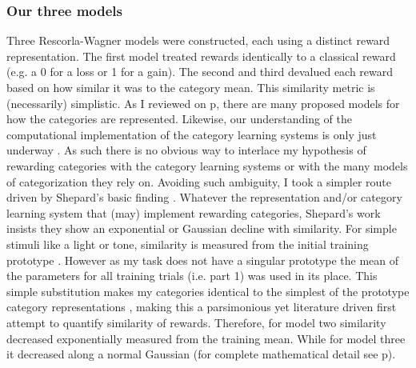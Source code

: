 \documentclass[doc,12pt]{apa}        %
\begin{document}
\subsubsection{Our three models}
\label{subsub:catquant}
Three Rescorla-Wagner models were constructed, each using a distinct reward representation.  The first model treated rewards identically to a classical reward (e.g. a 0 for a loss or 1 for a gain).  The second and third devalued each reward based on how similar it was to the category mean.  This similarity metric is (necessarily) simplistic.  As I reviewed on p\pageref{subsub:curves}, there are many proposed models for how the categories are represented.  Likewise, our understanding of the computational implementation of the category learning systems is only just underway \cite{Ashby:2005p9152,Ashby:2006p9153}.  As such there is no obvious way to interlace my hypothesis of rewarding categories with the category learning systems or with the many models of categorization they rely on.  Avoiding such ambiguity, I took a simpler route driven by Shepard's basic finding \cite{Shepard:1987p9102}.  Whatever the representation and/or category learning system that (may) implement rewarding categories, Shepard's work insists they show an exponential or Gaussian decline with similarity.  For simple stimuli like a light or tone, similarity is measured from the initial training prototype \cite{Guttman:1956p8355}.  However as my task does not have a singular prototype the mean of the parameters for all training trials (i.e. part 1) was used in its place.  This simple substitution makes my categories identical to the simplest of the prototype category representations \cite{Rosch:1973p9108,Ashby:1995p9109}, making this a parsimonious yet literature driven first attempt to quantify similarity of rewards.  Therefore, for model two similarity decreased exponentially measured from the training mean.  While for model three it decreased along a normal Gaussian (for complete mathematical detail see p\pageref{subsub:codesandfits}).  
\end{document}
